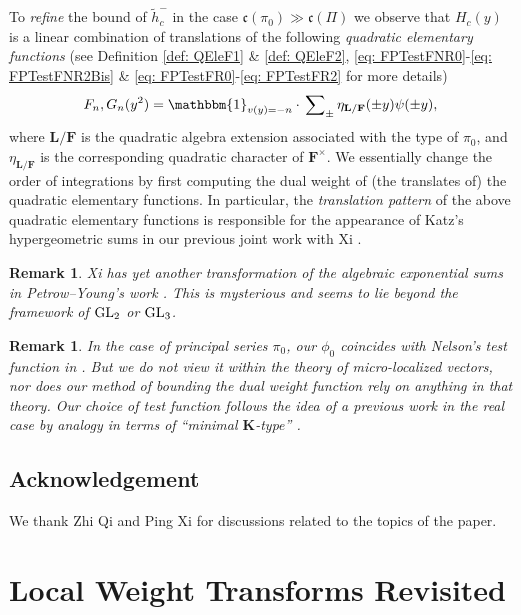 \documentclass[A4]{amsart}
\newtheorem{remark} [theorem] {Remark}
\numberwithin{equation}{section} \everymath{\displaystyle}
\newcommand{\gp}[1]{\mathbf{#1}}
\newcommand{\GL}{{\rm GL}}
\newcommand{\id}{\mathbbm{1}}
\newcommand{\F}{\mathbf{F}}
\newcommand{\bL}{\mathbf{L}}
\newcommand{\cond}{\mathfrak{c}}
\begin{document}
	To \emph{refine} the bound of $\widetilde{h}_c^-$ in the case $\cond(\pi_0) \gg \cond(\Pi)$ we observe that $H_c(y)$ is a linear combination of translations of the following \emph{quadratic elementary functions} (see Definition \ref{def: QEleF1} \& \ref{def: QEleF2}, \eqref{eq: FPTestFNR0}-\eqref{eq: FPTestFNR2Bis} \& \eqref{eq: FPTestFR0}-\eqref{eq: FPTestFR2} for more details)
\begin{equation} \label{eq: QEleF}
	F_n, G_n(y^2) = \id_{v(y)=-n} \cdot \sideset{}{_{\pm}} \sum \eta_{\bL/\F}(\pm y) \psi(\pm y), 
\end{equation}
where $\bL/\F$ is the quadratic algebra extension associated with the type of $\pi_0$, and $\eta_{\bL/\F}$ is the corresponding quadratic character of $\F^{\times}$. We essentially change the order of integrations by first computing the dual weight of (the translates of) the quadratic elementary functions. In particular, the \emph{translation pattern} of the above quadratic elementary functions is responsible for the appearance of Katz's hypergeometric sums in our previous joint work with Xi \cite{WX23+}.

\begin{remark}
	Xi \cite{Xi23} has yet another transformation of the algebraic exponential sums in Petrow--Young's work \cite{PY19_CF}. This is mysterious and seems to lie beyond the framework of $\GL_2$ or $\GL_3$.
\end{remark}

\begin{remark}
	In the case of principal series $\pi_0$, our $\phi_0$ coincides with Nelson's test function in \cite{Ne20}. But we do not view it within the theory of micro-localized vectors, nor does our method of bounding the dual weight function rely on anything in that theory. Our choice of test function follows the idea of a previous work \cite{BFW21+} in the real case by analogy in terms of ``minimal $\gp{K}$-type'' \cite{MP94}.
\end{remark}


	\subsection{Acknowledgement}
	
	We thank Zhi Qi and Ping Xi for discussions related to the topics of the paper.

	

\section{Local Weight Transforms Revisited}
\end{document}
